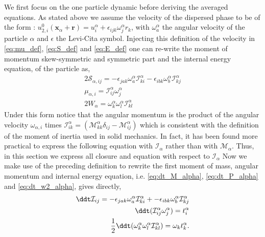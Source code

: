 We first focus on the one particle dynamic before deriving the averaged equations. 
As stated above we assume the velocity of the dispersed phase to be of the form : $u_{2,i}^0(\textbf{x}_\alpha + \textbf{r}) = u_{i}^\alpha + \epsilon_{ijk} {\omega}_{j}^\alpha {r}_k$, with $\omega_{a}^\alpha$ the angular velocity of the particle $\alpha$ and $\epsilon$ the Levi-Cita symbol.
Injecting this definition of the velocity in \ref{eq:mu_def}, \ref{eq:S_def} and \ref{eq:E_def} one can re-write the moment of momentum skew-symmetric and symmetric part and the internal energy equation, of the particle as,
\begin{align}
    \label{eq:S_def}
    2\mathcal{S}_{\alpha,ij}
    = - \epsilon_{jak} \omega_a^\alpha \mathcal{I}_{ki}^\alpha
      - \epsilon_{ibk} \omega_b^\alpha \mathcal{I}_{kj}^\alpha
    \\
    \label{eq:mu_def}
    \mu_{\alpha,i}
    =  \mathcal{I}_{ij}^\alpha \omega^\alpha_j\\
    2W_\alpha 
    = \omega^\alpha_k\omega^\alpha_l \mathcal{I}_{kl}^\alpha
\end{align}
Under this form notice that the angular momentum is the product of the angular velocity $\omega_{\alpha,i}$ times $\mathcal{I}_{ik}^\alpha = (\mathcal{M}_{kk}^\alpha \delta_{ij} - \mathcal{M}_{ij}^\alpha)$ which is consistent with the definition of the moment of inertia used in solid mechanics.
In fact, it has been found  more practical to express the following equation with $\mathcal{I}_\alpha$ rather than with $\mathcal{M}_\alpha$. 
Thus, in this section we express all closure and equation with respect to $\mathcal{I}_\alpha$
Now we make use of the preceding definition to rewrite the first moment of mass, angular momentum and internal energy equation, i.e. \ref{eq:dt_M_alpha}, \ref{eq:dt_P_alpha} and \ref{eq:dt_w2_alpha}, gives directly, 
\begin{align}
    \label{eq:dt_I_alpha}
    \ddt \mathcal{I}_{ij}
    = - \epsilon_{jak} \omega_a^\alpha \mathcal{I}_{ki}^\alpha + 
    - \epsilon_{ibk}   \omega_b^\alpha \mathcal{I}_{kj}^\alpha\\
    \label{eq:dt_Iomega_alpha}
    \ddt (\mathcal{I}_{ij}^\alpha \omega_j^\alpha)
    = t^\alpha_i\\
    \label{eq:dt_Iomegaomega_alpha}
    \frac{1}{2}\ddt (\omega^\alpha_k\omega^\alpha_l \mathcal{I}_{kl}^\alpha)
    = \omega_k t^\alpha_k. 
\end{align}
